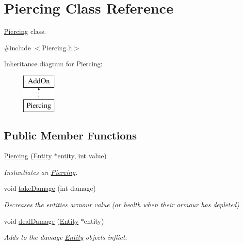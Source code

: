 \hypertarget{classPiercing}{}\section{Piercing Class Reference}
\label{classPiercing}


\hyperlink{classPiercing}{Piercing} class.  




{\ttfamily \#include $<$Piercing.\+h$>$}

Inheritance diagram for Piercing\+:\begin{figure}[H]
\begin{center}
\leavevmode
\includegraphics[height=2.000000cm]{classPiercing}
\end{center}
\end{figure}
\subsection*{Public Member Functions}
\begin{DoxyCompactItemize}
\item 
\hyperlink{classPiercing_a45a6d5d3b6e7ac24ebba63e56246d887}{Piercing} (\hyperlink{classEntity}{Entity} $\ast$entity, int value)
\begin{DoxyCompactList}\small\item\em Instantiates an \hyperlink{classPiercing}{Piercing}. \end{DoxyCompactList}\item 
void \hyperlink{classPiercing_a103634469a43e1662bd5e07e66901667}{take\+Damage} (int damage)
\begin{DoxyCompactList}\small\item\em Decreases the entities\textquotesingle{} armour value (or health when their armour has depleted) \end{DoxyCompactList}\item 
void \hyperlink{classPiercing_a2dbd4a497f9abbebbbd2ceb2909f6163}{deal\+Damage} (\hyperlink{classEntity}{Entity} $\ast$entity)
\begin{DoxyCompactList}\small\item\em Adds to the damage \hyperlink{classEntity}{Entity} objects inflict. \end{DoxyCompactList}\end{DoxyCompactItemize}


